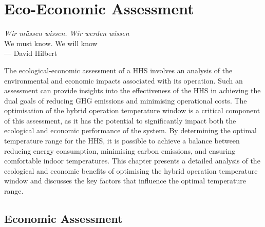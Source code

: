 \chapter{Eco-Economic Assessment}\label{ch:eco-ecoass} 

\begin{flushright}{\slshape
    Wir m\"ussen wissen. Wir werden wissen} \\ 
    We must know. We will know\\\medskip
    --- David Hilbert
\end{flushright}

The ecological-economic assessment of a \ac{HHS} involves an analysis of the environmental and economic impacts associated with its operation. Such an assessment can provide insights into the effectiveness of the \ac{HHS} in achieving the dual goals of reducing \ac{GHG} emissions and minimising operational costs. The optimisation of the hybrid operation temperature window is a critical component of this assessment, as it has the potential to significantly impact both the ecological and economic performance of the system. By determining the optimal temperature range for the \ac{HHS}, it is possible to achieve a balance between reducing energy consumption, minimising carbon emissions, and ensuring comfortable indoor temperatures. This chapter presents a detailed analysis of the ecological and economic benefits of optimising the hybrid operation temperature window and discusses the key factors that influence the optimal temperature range.

\section{Economic Assessment} \label{sec:ecoass}

